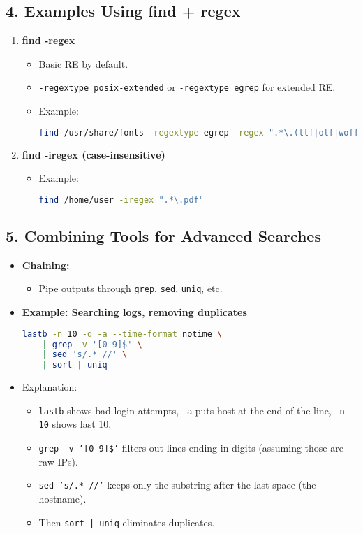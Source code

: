 \documentclass[a4paper]{report}
\begin{document}
\subsection*{4. Examples Using find + regex}
\begin{enumerate}
    \item \textbf{find -regex}
    \begin{itemize}
        \item Basic RE by default.
        \item \texttt{-regextype posix-extended} or \texttt{-regextype egrep} for extended RE.
        \item Example:
\begin{lstlisting}[language=bash]
find /usr/share/fonts -regextype egrep -regex ".*\.(ttf|otf|woff)$"
\end{lstlisting}
    \end{itemize}

    \item \textbf{find -iregex (case-insensitive)}
    \begin{itemize}
        \item Example:
\begin{lstlisting}[language=bash]
find /home/user -iregex ".*\.pdf"
\end{lstlisting}
    \end{itemize}
\end{enumerate}

\subsection*{5. Combining Tools for Advanced Searches}
\begin{itemize}
    \item \textbf{Chaining:}
    \begin{itemize}
        \item Pipe outputs through \texttt{grep}, \texttt{sed}, \texttt{uniq}, etc.
    \end{itemize}

    \item \textbf{Example: Searching logs, removing duplicates}
\begin{lstlisting}[language=bash]
lastb -n 10 -d -a --time-format notime \
    | grep -v '[0-9]$' \
    | sed 's/.* //' \
    | sort | uniq
\end{lstlisting}
    \item Explanation:
    \begin{itemize}
        \item \texttt{lastb} shows bad login attempts, \texttt{-a} puts host at the end of the line, \texttt{-n 10} shows last 10.
        \item \texttt{grep -v '[0-9]\$'} filters out lines ending in digits (assuming those are raw IPs).
        \item \texttt{sed 's/.* //'} keeps only the substring after the last space (the hostname).
        \item Then \texttt{sort | uniq} eliminates duplicates.
    \end{itemize}
\end{itemize}
\end{document}
